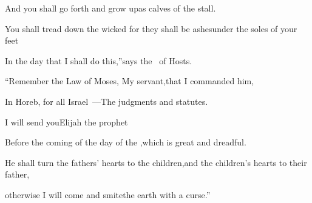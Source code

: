 \begin{inparaenum}
  \pb{}And you shall go forth and grow up\pa{}as calves of the stall.%

  \pa{} You shall tread down the wicked for they shall be ashes\pa{}under the soles of your feet%

  \pb{}In the day that I shall do this,''\pa{}says the \lord\ of Hosts.%

  \pa{}%
  ``Remember the Law of Moses, My servant,\pa{}that I commanded him,%

  \pb{}In Horeb, for all Israel~---\pa{}The judgments and statutes.%

  \pa{}%
  I will send you\pa{}Elijah the prophet%

  \pb{}Before the coming of the day of the \lord,\pa{}which is great and dreadful.%

  \pa{}%
  He shall turn the fathers' hearts to the children,\pa{}and the children's hearts to their father,%

  \pb{}otherwise I will come and smite\pa{}the earth with a curse.''%
\end{inparaenum}
